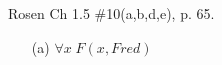 \documentclass[12pt,addpoints]{exam}
\begin{document}
\begin{questions}
\question[8] Rosen Ch 1.5 \#10(a,b,d,e), p. 65.
    \begin{solution}
    \begin{itemize}
        \item[(a)] $\forall x\; F(x,Fred)$

\end{itemize}
\end{solution}
\end{questions}
\end{document}
